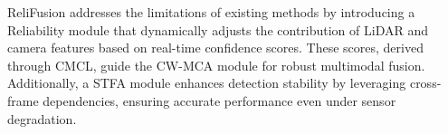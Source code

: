 ReliFusion addresses the limitations of existing methods by introducing a Reliability module that dynamically adjusts the contribution of LiDAR and camera features based on real-time confidence scores. These scores, derived through CMCL, guide the CW-MCA module for robust multimodal fusion. Additionally, a STFA module enhances detection stability by leveraging cross-frame dependencies, ensuring accurate performance even under sensor degradation.





